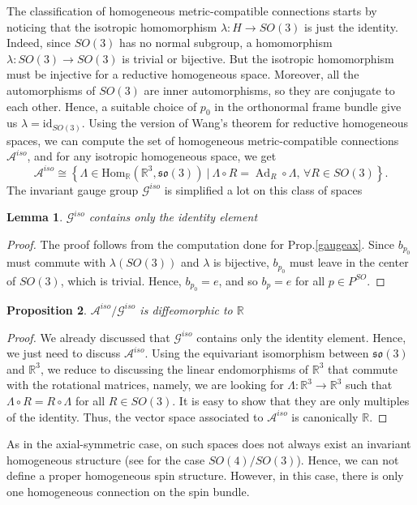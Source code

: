 \documentclass{article}
\numberwithin{equation}{section}
\newtheorem{proposition}{Proposition}[section]
\newtheorem{lemma}[proposition]{Lemma}
\theoremstyle{definition}
\newcommand{\R}{\mathbb{R}}
\newcommand{\A}{\mathcal{A}}
\newcommand{\so}[1]{\mathfrak{so}(#1)}
\newcommand{\Ad}{\operatorname{Ad}}
\begin{document}
The classification of homogeneous metric-compatible connections starts by noticing that the isotropic homomorphism $\lambda:H\to SO(3)$ is just the identity. Indeed, since $SO(3)$ has no normal subgroup, a homomorphism $\lambda:SO(3)\to SO(3)$ is trivial or bijective. But the isotropic homomorphism must be injective for a reductive homogeneous space. Moreover, all the automorphisms of $SO(3)$ are inner automorphisms, so they are conjugate to each other. Hence, a suitable choice of $p_0$ in the orthonormal frame bundle give us $\lambda=\mathrm{id}_{SO(3)}$. 
Using the version of Wang's theorem for reductive homogeneous spaces, we can compute the set of homogeneous metric-compatible connections $\A^{iso}$, and for any isotropic homogeneous space, we get
\begin{equation}
    \A^{iso}\cong\left\{\Lambda\in\mathrm{Hom}_{\R}(\R^3,\so{3})\ |\ \Lambda\circ R=\Ad_{R}\circ \Lambda,\,\forall R\in SO(3)\right\}.
\end{equation}
The invariant gauge group $\mathcal{G}^{iso}$ is simplified a lot on this class of spaces
\begin{lemma}
    $\mathcal{G}^{iso}$ contains only the identity element
\end{lemma}
\begin{proof}
    The proof follows from the computation done for Prop.\ref{gaugeax}. Since $b_{p_0}$ must commute with $\lambda(SO(3))$ and $\lambda$ is bijective, $b_{p_0}$ must leave in the center of $SO(3)$, which is trivial. Hence, $b_{p_0}=e$, and so $b_p=e$ for all $p\in P^{SO}$.
\end{proof}
\begin{proposition}
    $\A^{iso}/\mathcal{G}^{iso}$ is diffeomorphic to $\R$
\end{proposition}
\begin{proof}
    We already discussed that $\mathcal{G}^{iso}$ contains only the identity element. Hence, we just need to discuss $\A^{iso}$. Using the equivariant isomorphism between $\so{3}$ and $\R^3$, we reduce to discussing the linear endomorphisms of $\R^3$ that commute with the rotational matrices, namely, we are looking for $\Lambda:\R^3\to\R^3$ such that $\Lambda\circ R=R\circ \Lambda$ for all $R\in SO(3)$. It is easy to show that they are only multiples of the identity. Thus, the vector space associated to $\A^{iso}$ is canonically $\R$.
\end{proof}
As in the axial-symmetric case, on such spaces does not always exist an invariant homogeneous structure (see \cite{Lawn_2022} for the case $SO(4)/SO(3)$). Hence, we can not define a proper homogeneous spin structure. However, in this case, there is only one homogeneous connection on the spin bundle.
\end{document}
